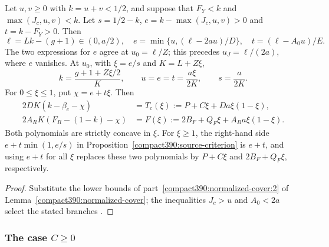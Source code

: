 \begin{lemma}
\label{compact392:cap-formulas}
Let $u,v\ge0$ with $k=u+v<1/2$, and suppose that $F_Y<k$ and $\max(J_c,u,v)<k$. Let $s=1/2-k$,
$e=k-\max(J_c,u,v)>0$ and $t=k-F_Y>0$. Then
\[
 \ell=Lk-(g+1)\in(0,a/2),\quad
 e=\min\{u,(\ell-2au)/D\},\quad t=(\ell-A_0u)/E.
\]
The two expressions for $e$ agree at $u_0=\ell/Z$;
this precedes $u_J=\ell/(2a)$, where $e$ vanishes. At $u_0$, with $\xi=e/s$ and $K=L+Z\xi$,
\[
 k=\frac{g+1+Z\xi/2}{K},\qquad
 u=e=t=\frac{a\xi}{2K},\qquad s=\frac a{2K}.
\]
For $0\le\xi\le1$, put $\chi=e+t\xi$. Then
\begin{align}
 2DK(k-\beta_c-\chi)
 &=T_c(\xi):=P+C\xi+Da\xi(1-\xi),
 \label{compact392:triangle-cap}\\
 2A_RK(F_R-(1-k)-\chi)
 &=F(\xi):=2B_F+Q_F\xi+A_Ra\xi(1-\xi).
 \label{compact392:singleton-cap}
\end{align}
Both polynomials are strictly concave in $\xi$.
For $\xi\ge1$, the right-hand side $e+t\min(1,e/s)$ in Proposition~\ref{compact390:source-criterion} is $e+t$, and
using $e+t$ for all $\xi$ replaces these two polynomials by $P+C\xi$ and
$2B_F+Q_F\xi$, respectively.
\end{lemma}
\begin{proof}
Substitute the lower bounds of part~\ref{compact390:normalized-cover:2}
of Lemma~\ref{compact390:normalized-cover}; the inequalities $J_c>u$
and $A_0<2a$ select the stated branches .
\end{proof}

\subsubsection{The case $C\ge0$}

